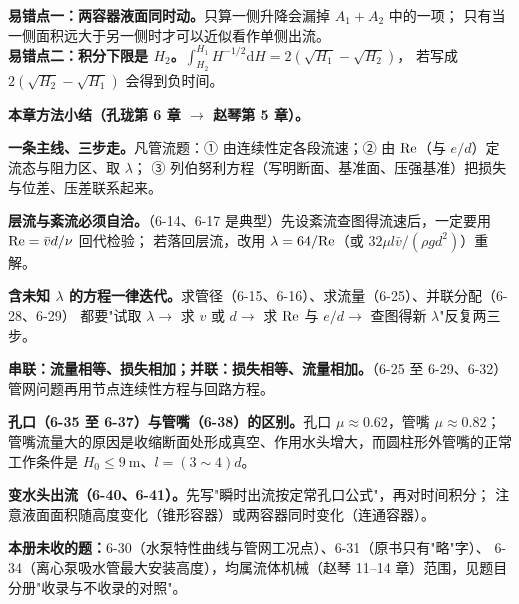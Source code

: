 \begin{yicuo}
\textbf{易错点一：两容器液面同时动。}只算一侧升降会漏掉 $A_1+A_2$ 中的一项；
只有当一侧面积远大于另一侧时才可以近似看作单侧出流。\\
\textbf{易错点二：积分下限是 $H_2$。}$\int_{H_2}^{H_1}H^{-1/2}\mathrm dH=2(\sqrt{H_1}-\sqrt{H_2})$，
若写成 $2(\sqrt{H_2}-\sqrt{H_1})$ 会得到负时间。
\end{yicuo}

\begin{tishi}
\textbf{本章方法小结（孔珑第 6 章 $\to$ 赵琴第 5 章）。}
\begin{xiaowen}
\item \textbf{一条主线、三步走。}凡管流题：① 由连续性定各段流速；② 由 $\mathrm{Re}$（与 $e/d$）定流态与阻力区、取 $\lambda$；
③ 列伯努利方程（写明断面、基准面、压强基准）把损失与位差、压差联系起来。
\item \textbf{层流与紊流必须自洽。}（6-14、6-17 是典型）先设紊流查图得流速后，一定要用 $\mathrm{Re}=\bar vd/\nu$ 回代检验；
若落回层流，改用 $\lambda=64/\mathrm{Re}$（或 $32\mu l\bar v/(\rho gd^2)$）重解。
\item \textbf{含未知 $\lambda$ 的方程一律迭代。}求管径（6-15、6-16）、求流量（6-25）、并联分配（6-28、6-29）
都要"试取 $\lambda\to$ 求 $v$ 或 $d\to$ 求 $\mathrm{Re}$ 与 $e/d\to$ 查图得新 $\lambda$"反复两三步。
\item \textbf{串联：流量相等、损失相加；并联：损失相等、流量相加。}（6-25 至 6-29、6-32）
管网问题再用节点连续性方程与回路方程。
\item \textbf{孔口（6-35 至 6-37）与管嘴（6-38）的区别。}孔口 $\mu\approx0.62$，管嘴 $\mu\approx0.82$；
管嘴流量大的原因是收缩断面处形成真空、作用水头增大，而圆柱形外管嘴的正常工作条件是
$H_0\le9\ \mathrm{m}$、$l=(3\sim4)d$。
\item \textbf{变水头出流（6-40、6-41）。}先写"瞬时出流按定常孔口公式"，再对时间积分；
注意液面面积随高度变化（锥形容器）或两容器同时变化（连通容器）。
\end{xiaowen}
\textbf{本册未收的题：}6-30（水泵特性曲线与管网工况点）、6-31（原书只有"略"字）、
6-34（离心泵吸水管最大安装高度），均属流体机械（赵琴 11--14 章）范围，见题目分册"收录与不收录的对照"。
\end{tishi}

